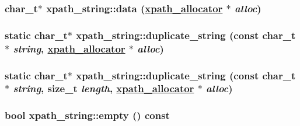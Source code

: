 \hypertarget{classxpath__string_de42a938746bcba171b70bfb88c3c568}{
\subsubsection[data]{\setlength{\rightskip}{0pt plus 5cm}char\_\-t$\ast$ xpath\_\-string::data (\hyperlink{classxpath__allocator}{xpath\_\-allocator} $\ast$ {\em alloc})}}
\label{classxpath__string_de42a938746bcba171b70bfb88c3c568}


\hypertarget{classxpath__string_8e1458ed23ff94c0c27f8eb96fb26b11}{
\subsubsection[duplicate\_\-string]{\setlength{\rightskip}{0pt plus 5cm}static char\_\-t$\ast$ xpath\_\-string::duplicate\_\-string (const char\_\-t $\ast$ {\em string}, \hyperlink{classxpath__allocator}{xpath\_\-allocator} $\ast$ {\em alloc})}}
\label{classxpath__string_8e1458ed23ff94c0c27f8eb96fb26b11}


\hypertarget{classxpath__string_57c53a0b67fecb1845c31215d8ee206b}{
\subsubsection[duplicate\_\-string]{\setlength{\rightskip}{0pt plus 5cm}static char\_\-t$\ast$ xpath\_\-string::duplicate\_\-string (const char\_\-t $\ast$ {\em string}, size\_\-t {\em length}, \hyperlink{classxpath__allocator}{xpath\_\-allocator} $\ast$ {\em alloc})}}
\label{classxpath__string_57c53a0b67fecb1845c31215d8ee206b}


\hypertarget{classxpath__string_2a4f1988a700e20405c0f2c23d4e08a9}{
\subsubsection[empty]{\setlength{\rightskip}{0pt plus 5cm}bool xpath\_\-string::empty () const}}
\label{classxpath__string_2a4f1988a700e20405c0f2c23d4e08a9}


